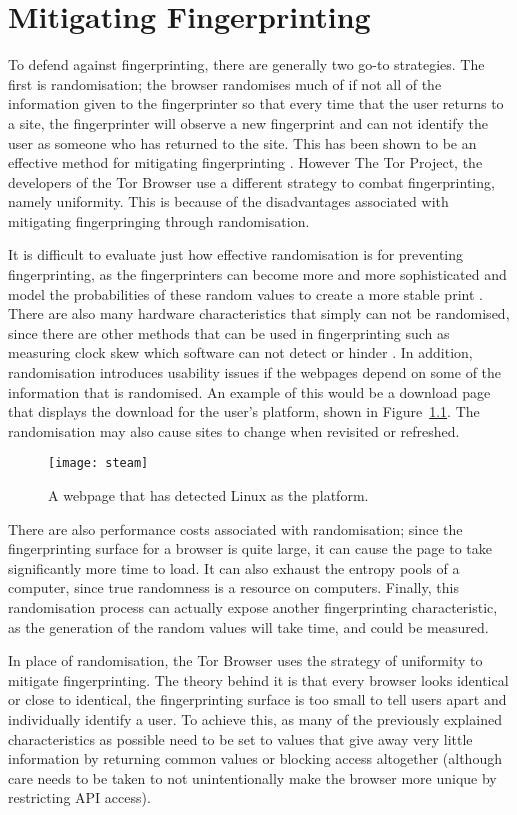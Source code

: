 \chapter{Mitigating Fingerprinting}

To defend against fingerprinting, there are generally two go-to strategies.
The first is randomisation; the browser randomises much of if not all of the information given to the fingerprinter so that every time that the user returns to a site, the fingerprinter will observe a new fingerprint and can not identify the user as someone who has returned to the site.
This has been shown to be an effective method for mitigating fingerprinting \citep{privaricator}.
However The Tor Project, the developers of the Tor Browser use a different strategy to combat fingerprinting, namely uniformity.
This is because of the disadvantages associated with mitigating fingerpringing through randomisation.

It is difficult to evaluate just how effective randomisation is for preventing fingerprinting, as the fingerprinters can become more and more sophisticated and model the probabilities of these random values to create a more stable print \citep{tor-project}.
There are also many hardware characteristics that simply can not be randomised, since there are other methods that can be used in fingerprinting such as measuring clock skew which software can not detect or hinder \citep{skew}.
In addition, randomisation introduces usability issues if the webpages depend on some of the information that is randomised.
An example of this would be a download page that displays the download for the user's platform, shown in Figure~\ref{fig:steam}.
The randomisation may also cause sites to change when revisited or refreshed.

\begin{figure}[h]
\texttt{[image: steam]}
\centering
\caption{A webpage that has detected Linux as the platform.}
\label{fig:steam}
\end{figure}

There are also performance costs associated with randomisation; since the fingerprinting surface for a browser is quite large, it can cause the page to take significantly more time to load.
It can also exhaust the entropy pools of a computer, since true randomness is a resource on computers.
Finally, this randomisation process can actually expose another fingerprinting characteristic, as the generation of the random values will take time, and could be measured.

In place of randomisation, the Tor Browser uses the strategy of uniformity to mitigate fingerprinting.
The theory behind it is that every browser looks identical or close to identical, the fingerprinting surface is too small to tell users apart and individually identify a user.
To achieve this, as many of the previously explained characteristics as possible need to be set to values that give away very little information by returning common values or blocking access altogether (although care needs to be taken to not unintentionally make the browser more unique by restricting API access).

